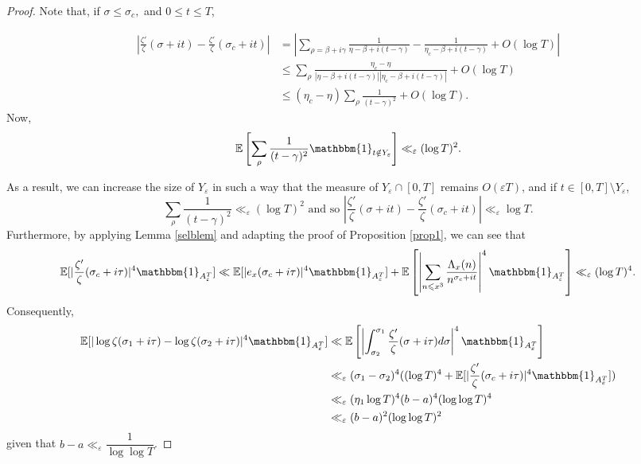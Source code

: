 \documentclass{article}
\newcommand{\1}{\mathds{1}}
\numberwithin{equation}{section}
\newcommand{\eps}{\varepsilon}
\renewcommand{\leq}{\leqslant}
\newcommand{\E}{\mathbb{E}}
\theoremstyle{plain} %
\begin{document}
\begin{proof}

Note that, if $\sigma \leq \sigma_c,$ and $0 \leq t \leq T$,

\begin{equation}
    \begin{split}
        |\frac{\zeta'}{\zeta}(\sigma + it) - \frac{\zeta'}{\zeta}(\sigma_c + it)| & = |\sum_{\rho = \beta + i \gamma} \frac{1}{\eta - \beta + i (t - \gamma)} -  \frac{1}{\eta_c - \beta + i (t - \gamma)} + O(\log T)| \\
        & \leq \sum_{\rho} \frac{\eta_c - \eta}{|\eta - \beta + i (t - \gamma)||\eta_c - \beta + i (t - \gamma)|} + O(\log T) \\
        & \leq (\eta_c - \eta)\sum_\rho \frac{1}{(t - \gamma)^2} + O(\log T) .
    \end{split}
\end{equation}
Now, 
$$\E \left[ \sum_\rho \frac{1}{(t - \gamma)^2} \mathbbm{1}_{t \notin Y_{\eps}} \right] \ll_\eps (\log T)^2.$$

As a result, we can increase the size of $Y_\eps$ in such a way that the measure of $Y_\eps \cap [0, T]$ remains $O(\eps T)$, and if $t \in [0, T] \setminus Y_\eps$,
\begin{equation}
\label{logder}
    \sum_\rho \frac{1}{(t - \gamma)^2} \ll_\eps (\log T)^2 \text{ and so } |\frac{\zeta'}{\zeta}(\sigma + it) - \frac{\zeta'}{\zeta}(\sigma_c + it)| \ll_\eps \log T.
\end{equation}
Furthermore, by applying Lemma \ref{selblem} and adapting the proof of Proposition \ref{prop1}, we can see that
\begin{equation}
    \E[|\frac{\zeta'}{\zeta}(\sigma_c + i \tau)|^4 \mathbbm{1}_{A_\eps^T} ] \ll  \E[|e_x(\sigma_c + i \tau)|^4\mathbbm{1}_{A_\eps^T} ] + \E\left[\left|\sum_{n \leq x^3} \frac{\Lambda_x(n)}{n^{\sigma_c + it}} \right|^4\mathbbm{1}_{A_\eps^T}\right ] \ll_\eps (\log T)^4.
\end{equation}
Consequently,
\begin{equation} \label{lasteq}
    \begin{split}
        \E [ |\log \zeta (\sigma_1 + i \tau) - \log \zeta (\sigma_2 + i\tau)|^4 \mathbbm{1}_{A_\eps^T} ] & \ll \E \left[ \left|\int_{\sigma_2}^{\sigma_1} \frac{\zeta'}{\zeta}(\sigma + i\tau)d\sigma\right|^4\mathbbm{1}_{A_\eps^T}\right] \\
        & \ll_\eps (\sigma_1 - \sigma_2)^4 ((\log T)^4 + \E [|\frac{\zeta'}{\zeta} (\sigma_c + i\tau)|^4\mathbbm{1}_{A_\eps^T}]) \\
        & \ll_\eps (\eta_1 \log T)^4 (b - a)^4 (\log \log T)^4 \\
        & \ll_\eps (b - a)^2 (\log \log T)^2
    \end{split}
\end{equation}
given that $b - a \ll_\eps \dfrac{1}{\log \log T}$.
\end{proof}
\end{document}
